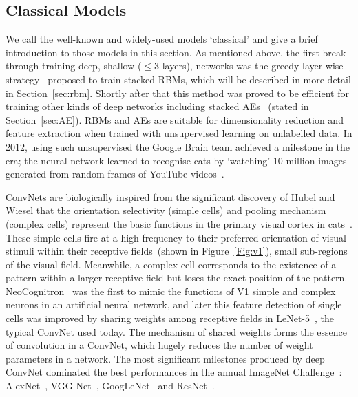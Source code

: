 \subsection{Classical Models}
We call the well-known and widely-used \protect{} \protect{} models `classical' and give a brief introduction to those models in this section. 
As mentioned above, the first break-through \protect{} \protect{} training deep, \protect{} \protect{} shallow ($\le 3$ layers), networks was the greedy layer-wise strategy~\citep{hinton2006fast} proposed to train stacked RBMs, which will be described in more detail in Section~\ref{sec:rbm}.
Shortly after that this method was proved to be efficient for training other kinds of deep networks including stacked AEs~\citep{bengio2007greedy} (stated in Section~\ref{sec:AE}).
RBMs and AEs are suitable for dimensionality reduction and feature extraction when trained with unsupervised learning on unlabelled data.
In 2012, using such \protect{} \protect{} unsupervised \protect{} \protect{} the Google Brain team achieved a milestone in the \protect{} \protect{} era; the neural network learned to recognise cats by `watching' 10 million images generated from random frames of YouTube videos~\citep{le2013building}.

ConvNets are biologically inspired from the significant discovery of Hubel and Wiesel that the orientation selectivity (simple cells) and pooling mechanism (complex cells) represent the basic functions in the primary visual cortex in cats~\citep{hubel1962receptive}.
These simple cells fire at a high frequency to their preferred orientation of visual stimuli within their receptive fields~(shown in Figure~\ref{Fig:v1}), small sub-regions of the visual field.
Meanwhile, a complex cell corresponds to the existence of a pattern within a larger receptive field but loses the exact position of the pattern.
\protect{} NeoCognitron~\citep{fukushima1982neocognitron} was the first \protect{} to mimic the functions of V1 simple and complex neurons in an artificial neural network, and later this feature detection of single cells was improved by sharing weights among receptive fields in LeNet-5~\citep{lecun1998gradient}, the typical ConvNet used today.
The mechanism of shared weights forms the essence of convolution in a ConvNet, which hugely reduces the number of weight parameters in a network.
The most significant milestones produced by deep ConvNet dominated the best performances in the annual ImageNet Challenge~\citep{russakovsky2015imagenet}: AlexNet~\citep{krizhevsky2012imagenet}, VGG Net~\citep{simonyan2014very}, GoogLeNet~\citep{szegedy2015going} and ResNet~\citep{he2016deep}.

